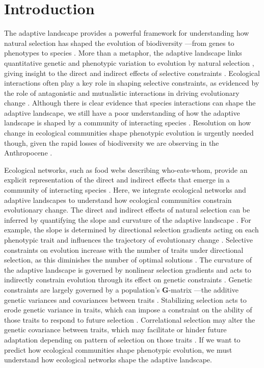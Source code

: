 \documentclass[11pt,]{article}
\begin{document}
\newpage

\section{Introduction}\label{introduction}

The adaptive landscape provides a powerful framework for understanding
how natural selection has shaped the evolution of biodiversity ---from
genes to phenotypes to species
\citep{Wright1931, Simpson1944, Arnold2001}. More than a metaphor, the
adaptive landscape links quantitative genetic and phenotypic variation
to evolution by natural selection
\citep{Lande1979, Arnold1984applications, Arnold1984theory}, giving
insight to the direct and indirect effects of selective constraints
\citep{Arnold1992}. Ecological interactions often play a key role in
shaping selective constraints, as evidenced by the role of antagonistic
and mutualistic interactions in driving evolutionary change
\citep{Schluter2000, Abrams2000, Bronstein2006}. Although there is clear
evidence that species interactions can shape the adaptive landscape, we
still have a poor understanding of how the adaptive landscape is shaped
by a community of interacting species \citep{McPeek2017, terHorst2018}.
Resolution on how change in ecological communities shape phenotypic
evolution is urgently needed though, given the rapid losses of
biodiversity we are observing in the Anthropocene \citep{Scheffers2016}.

Ecological networks, such as food webs describing who-eats-whom, provide
an explicit representation of the direct and indirect effects that
emerge in a community of interacting species
\citep{Bascompte2014, McCann2012}. Here, we integrate ecological
networks and adaptive landscapes to understand how ecological
communities constrain evolutionary change. The direct and indirect
effects of natural selection can be inferred by quantifying the slope
and curvature of the adaptive landscape \citep{Arnold1992}. For example,
the slope is determined by directional selection gradients acting on
each phenotypic trait and influences the trajectory of evolutionary
change \citep{Lande1979, Arnold1992}. Selective constraints on evolution
increase with the number of traits under directional selection, as this
diminishes the number of optimal solutions \citep{Arnold2003}. The
curvature of the adaptive landscape is governed by nonlinear selection
gradients and acts to indirectly constrain evolution through its effect
on genetic constraints \citep{Arnold1992, Hansen2008}. Genetic
constraints are largely governed by a population's \textbf{G}-matrix
---the additive genetic variances and covariances between traits
\citep{Hansen2008}. Stabilizing selection acts to erode genetic variance
in traits, which can impose a constraint on the ability of those traits
to respond to future selection \citep{Hansen2008}. Correlational
selection may alter the genetic covariance between traits, which may
facilitate or hinder future adaptation depending on pattern of selection
on those traits \citep{Hansen2008}. If we want to predict how ecological
communities shape phenotypic evolution, we must understand how
ecological networks shape the adaptive landscape.
\end{document}
